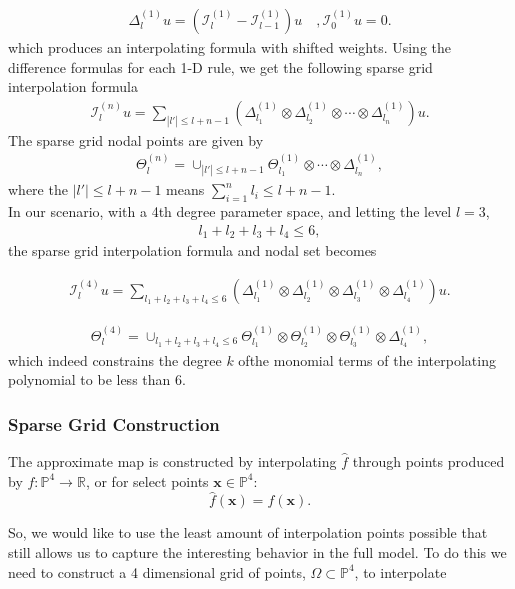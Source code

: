 \documentclass{article}
\begin{document}
\begin{align*}
\Delta_l^{(1)}u = (\mathcal{I}_l^{(1)} - \mathcal{I}_{l-1}^{(1)} )u \quad, \mathcal{I}_0^{(1)}u = 0. 
\end{align*}
which produces an interpolating formula with shifted weights. Using the difference formulas for each 1-D rule, we get the following sparse grid interpolation formula
\begin{align*}
\mathcal{I}_l^{(n)}u = \sum_{|l'| \le l+n-1} (\Delta_{l_1}^{(1)}\otimes\Delta_{l_2}^{(1)}\otimes\cdots\otimes\Delta_{l_n}^{(1)})u.
\end{align*}
The sparse grid nodal points are given by
\begin{align*}
\Theta_l^{(n)} = \cup_{|l'| \le l+n-1} \Theta_{l_1}^{(1)} \otimes \cdots \otimes \Delta_{l_n}^{(1)},
\end{align*}
where the $|l'|\le l+ n-1$ means $\sum_{i=1}^{n}l_i \le l+ n -1$.\\
\vspace{0.01cm}
In our scenario, with a 4th degree parameter space, and letting the level $l=3$,
\begin{align*}
l_1 + l_2 + l_3 + l_4 \le 6,
\end{align*}
the sparse grid interpolation formula and nodal set becomes

\begin{align*}
\mathcal{I}_l^{(4)}u = \sum_{l_1 + l_2 + l_3 + l_4 \le 6} (\Delta_{l_1}^{(1)}\otimes\Delta_{l_2}^{(1)}\otimes\Delta_{l_3}^{(1)}\otimes\Delta_{l_4}^{(1)})u.
\end{align*}

\begin{align*}
\Theta_l^{(4)} = \cup_{l_1 + l_2 + l_3 + l_4 \le 6} \Theta_{l_1}^{(1)} \otimes  \Theta_{l_2}^{(1)}\otimes  \Theta_{l_3}^{(1)} \otimes \Delta_{l_4}^{(1)},
\end{align*}
which indeed constrains the degree $k$ ofthe  monomial terms of the interpolating polynomial to be less than $6$.

\subsubsection{Sparse Grid Construction}
The approximate map is constructed by interpolating $\hat{f}$ through points produced by $f:\mathbb{P}^4 \to \mathbb{R}$,  or for select points $\textbf{x} \in \mathbb{P}^4$: 
$$\hat{f}(\textbf{x}) = f(\textbf{x}).$$

So, we would like to use the least amount of interpolation points possible that still allows us to capture the interesting behavior in the full model. To do this we need to construct a 4 dimensional grid of points, $\Omega \subset \mathbb{P}^4$, to interpolate\\
\end{document}

